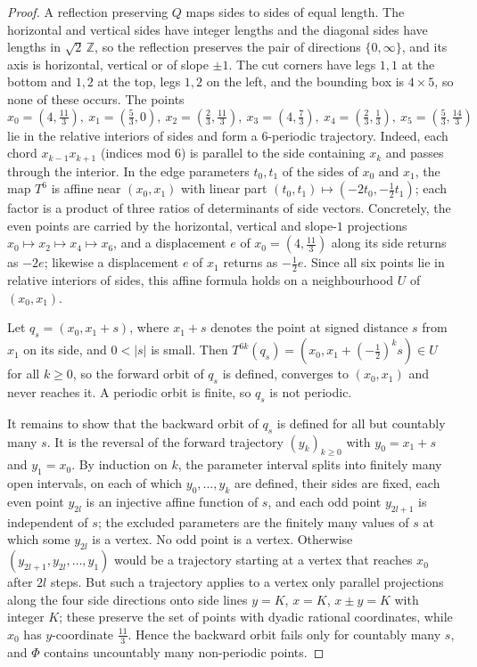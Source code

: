 \documentclass[11pt]{amsart}
\theoremstyle{definition}
\theoremstyle{remark}
\newcommand{\Z}{\mathbb Z}
\begin{document}
\begin{proof}
A reflection preserving $Q$ maps sides to sides of equal length. The horizontal and vertical sides have integer lengths and the diagonal sides have lengths in $\sqrt2\,\Z$, so the reflection preserves the pair of directions $\{0,\infty\}$, and its axis is horizontal, vertical or of slope $\pm1$. The cut corners have legs $1,1$ at the bottom and $1,2$ at the top, legs $1,2$ on the left, and the bounding box is $4\times5$, so none of these occurs. The points
\[
x_0=(4,\tfrac{11}3),\ x_1=(\tfrac53,0),\ x_2=(\tfrac23,\tfrac{11}3),\ x_3=(4,\tfrac73),\ x_4=(\tfrac23,\tfrac13),\ x_5=(\tfrac53,\tfrac{14}3)
\]
lie in the relative interiors of sides and form a $6$-periodic trajectory. Indeed, each chord $x_{k-1}x_{k+1}$ (indices mod $6$) is parallel to the side containing $x_k$ and passes through the interior. In the edge parameters $t_0,t_1$ of the sides of $x_0$ and $x_1$, the map $T^6$ is affine near $(x_0,x_1)$ with linear part $(t_0,t_1)\mapsto(-2t_0,-\frac12t_1)$; each factor is a product of three ratios of determinants of side vectors. Concretely, the even points are carried by the horizontal, vertical and slope-$1$ projections $x_0\mapsto x_2\mapsto x_4\mapsto x_6$, and a displacement $e$ of $x_0=(4,\frac{11}3)$ along its side returns as $-2e$; likewise a displacement $e$ of $x_1$ returns as $-\frac12e$. Since all six points lie in relative interiors of sides, this affine formula holds on a neighbourhood $U$ of $(x_0,x_1)$.

Let $q_s=(x_0,x_1+s)$, where $x_1+s$ denotes the point at signed distance $s$ from $x_1$ on its side, and $0<|s|$ is small. Then $T^{6k}(q_s)=(x_0,x_1+(-\frac12)^ks)\in U$ for all $k\ge0$, so the forward orbit of $q_s$ is defined, converges to $(x_0,x_1)$ and never reaches it. A periodic orbit is finite, so $q_s$ is not periodic.

It remains to show that the backward orbit of $q_s$ is defined for all but countably many $s$. It is the reversal of the forward trajectory $(y_k)_{k\ge0}$ with $y_0=x_1+s$ and $y_1=x_0$. By induction on $k$, the parameter interval splits into finitely many open intervals, on each of which $y_0,\dots,y_k$ are defined, their sides are fixed, each even point $y_{2l}$ is an injective affine function of $s$, and each odd point $y_{2l+1}$ is independent of $s$; the excluded parameters are the finitely many values of $s$ at which some $y_{2l}$ is a vertex. No odd point is a vertex. Otherwise $(y_{2l+1},y_{2l},\dots,y_1)$ would be a trajectory starting at a vertex that reaches $x_0$ after $2l$ steps. But such a trajectory applies to a vertex only parallel projections along the four side directions onto side lines $y=K$, $x=K$, $x\pm y=K$ with integer $K$; these preserve the set of points with dyadic rational coordinates, while $x_0$ has $y$-coordinate $\frac{11}3$. Hence the backward orbit fails only for countably many $s$, and $\Phi$ contains uncountably many non-periodic points.
\end{proof}
\end{document}
